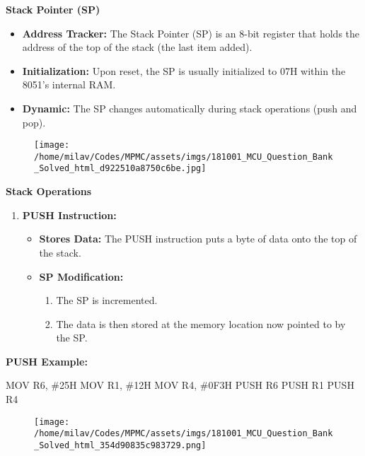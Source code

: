 \documentclass[
]{article}
\newenvironment{Shaded}{}{}
\newcommand{\NormalTok}[1]{#1}
\begin{document}
\textbf{Stack Pointer (SP)}

\begin{itemize}
\item
  \textbf{Address Tracker:} The Stack Pointer (SP) is an 8-bit register
  that holds the address of the top of the stack (the last item added).
\item
  \textbf{Initialization:} Upon reset, the SP is usually initialized to
  07H within the 8051's internal RAM.
\item
  \textbf{Dynamic:} The SP changes automatically during stack operations
  (push and pop).
\end{itemize}

\begin{figure}
\centering
\texttt{[image: /home/milav/Codes/MPMC/assets/imgs/181001\_MCU\_Question\_Bank\_Solved\_html\_d922510a8750c6be.jpg]}
\caption{}
\end{figure}

\textbf{Stack Operations}

\begin{enumerate}
\def\labelenumi{\arabic{enumi}.}
\item
  \textbf{PUSH Instruction:}

  \begin{itemize}
  \item
    \textbf{Stores Data:} The PUSH instruction puts a byte of data onto
    the top of the stack.
  \item
    \textbf{SP Modification:}

    \begin{enumerate}
    \def\labelenumii{\arabic{enumii}.}
    \item
      The SP is incremented.
    \item
      The data is then stored at the memory location now pointed to by
      the SP.
    \end{enumerate}
  \end{itemize}
\end{enumerate}

\textbf{PUSH Example:}

\begin{Shaded}
\begin{Highlighting}[]
\NormalTok{MOV R6, \#25H}
\NormalTok{MOV R1, \#12H}
\NormalTok{MOV R4, \#0F3H}
\NormalTok{PUSH R6}
\NormalTok{PUSH R1}
\NormalTok{PUSH R4}
\end{Highlighting}
\end{Shaded}

\begin{figure}
\centering
\texttt{[image: /home/milav/Codes/MPMC/assets/imgs/181001\_MCU\_Question\_Bank\_Solved\_html\_354d90835c983729.png]}
\caption{}
\end{figure}
\end{document}
